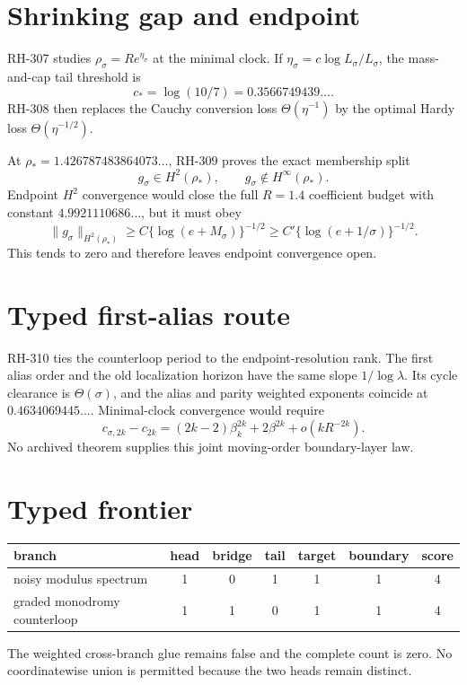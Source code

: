 \documentclass[11pt]{article}
\theoremstyle{remark}\newtheorem{remark}[proposition]{Remark}
\begin{document}
\section{Shrinking gap and endpoint}
RH-307 studies $\rho_\sigma=Re^{\eta_\sigma}$ at the minimal clock.  If
$\eta_\sigma=c\log L_\sigma/L_\sigma$, the mass-and-cap tail threshold is
\[
 c_*=\log(10/7)=0.3566749439\ldots.
\]
RH-308 then replaces the Cauchy conversion loss $\Theta(\eta^{-1})$ by the
optimal Hardy loss $\Theta(\eta^{-1/2})$.

At $\rho_*=1.426787483864073\ldots$, RH-309 proves the exact membership
split
\[
 g_\sigma\in H^2(\rho_*),\qquad
 g_\sigma\notin H^\infty(\rho_*).
\]
Endpoint $H^2$ convergence would close the full $R=1.4$ coefficient budget
with constant $4.9921110686\ldots$, but it must obey
\[
\|g_\sigma\|_{H^2(\rho_*)}
 \ge C\{\log(e+M_\sigma)\}^{-1/2}
 \ge C'\{\log(e+1/\sigma)\}^{-1/2}.
\]
This tends to zero and therefore leaves endpoint convergence open.

\section{Typed first-alias route}
RH-310 ties the counterloop period to the endpoint-resolution rank.  The
first alias order and the old localization horizon have the same slope
$1/\log\lambda$.  Its cycle clearance is $\Theta(\sigma)$, and the alias and
parity weighted exponents coincide at
$0.4634069445\ldots$.  Minimal-clock convergence would require
\[
 c_{\sigma,2k}-c_{2k}
 =(2k-2)\beta_k^{2k}+2\beta^{2k}+o(kR^{-2k}).
\]
No archived theorem supplies this joint moving-order boundary-layer law.

\section{Typed frontier}
\begin{center}\small
\begin{tabular}{lccccc|c}\toprule
branch & head & bridge & tail & target & boundary & score\\\midrule
noisy modulus spectrum &1&0&1&1&1&4\\
graded monodromy counterloop &1&1&0&1&1&4\\\bottomrule
\end{tabular}
\end{center}
The weighted cross-branch glue remains false and the complete count is zero.
No coordinatewise union is permitted because the two heads remain distinct.
\end{document}
